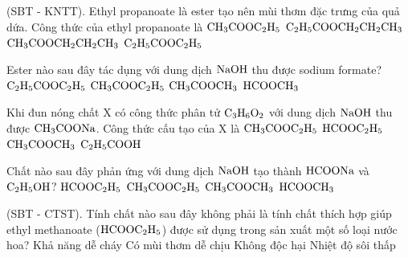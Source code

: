 \documentclass[12pt,a4paper]{article}
\begin{document}
\begin{ex}
(SBT - KNTT). Ethyl propanoate là ester tạo nên mùi thơm đặc trưng của quả dứa. Công thức của ethyl propanoate là
\choice
{$\ce{CH3COOC2H5}$}
{$\ce{C2H5COOCH2CH2CH3}$}
{$\ce{CH3COOCH2CH2CH3}$}
{\True $\ce{C2H5COOC2H5}$}
\end{ex}

\begin{ex}
Ester nào sau đây tác dụng với dung dịch $\ce{NaOH}$ thu được sodium formate?
\choice
{$\ce{C2H5COOC2H5}$}
{$\ce{CH3COOC2H5}$}
{$\ce{CH3COOCH3}$}
{\True $\ce{HCOOCH3}$}
\end{ex}

\begin{ex}
Khi đun nóng chất X có công thức phân tử $\ce{C3H6O2}$ với dung dịch $\ce{NaOH}$ thu được $\ce{CH3COONa}$. Công thức cấu tạo của X là
\choice
{$\ce{CH3COOC2H5}$}
{$\ce{HCOOC2H5}$}
{\True $\ce{CH3COOCH3}$}
{$\ce{C2H5COOH}$}
\end{ex}

\begin{ex}
Chất nào sau đây phản ứng với dung dịch $\ce{NaOH}$ tạo thành $\ce{HCOONa}$ và $\ce{C2H5OH}$?
\choice
{\True $\ce{HCOOC2H5}$}
{$\ce{CH3COOC2H5}$}
{$\ce{CH3COOCH3}$}
{$\ce{HCOOCH3}$}
\end{ex}

\begin{ex}
(SBT - CTST). Tính chất nào sau đây không phải là tính chất thích hợp giúp ethyl methanoate ($\ce{HCOOC2H5}$) được sử dụng trong sản xuất một số loại nước hoa?
\choice
{\True Khả năng dễ cháy}
{Có mùi thơm dễ chịu}
{Không độc hại}
{Nhiệt độ sôi thấp}
\end{ex}
\end{document}
